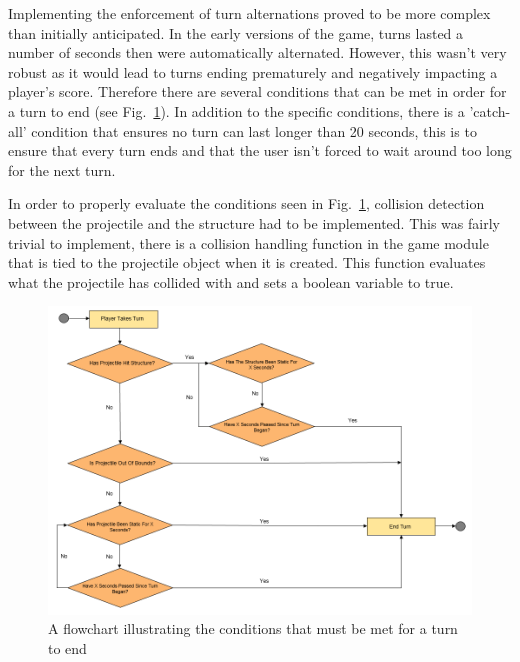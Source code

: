 \documentclass[runningheads]{llncs}
\begin{document}
	Implementing the enforcement of turn alternations proved to be more complex than initially anticipated. In the early versions of the game, turns lasted a number of seconds then were automatically alternated. However, this wasn't very robust as it would lead to turns ending prematurely and negatively impacting a player's score. Therefore there are several conditions that can be met in order for a turn to end (see Fig.~\ref{turn-flowchart}). In addition to the specific conditions, there is a 'catch-all' condition that ensures no turn can last longer than 20 seconds, this is to ensure that every turn ends and that the user isn't forced to wait around too long for the next turn.
	
	In order to properly evaluate the conditions seen in Fig.~\ref{turn-flowchart}, collision detection between the projectile and the structure had to be implemented. This was fairly trivial to implement, there is a collision handling function in the game module that is tied to the projectile object when it is created. This function evaluates what the projectile has collided with and sets a boolean variable to true. 
	
	\newpage
	\begin{figure}
		\centering
		\includegraphics[width=\textwidth]{./img/turn-flowchart.png}
		\caption{A flowchart illustrating the conditions that must be met for a turn to end}
		\label{turn-flowchart}
	\end{figure} 
	
\end{document}
